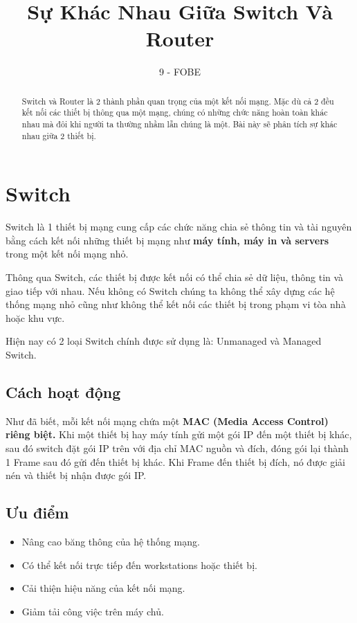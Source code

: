 \documentclass[12pt]{article}
\title{Sự Khác Nhau Giữa Switch Và Router}
\author{\textup{9 - FOBE}}
\begin{document}
    

    \begin{abstract}
    Switch và Router là 2 thành phần quan trọng của một kết nối mạng. Mặc dù cả 2
    đều kết nối các thiết bị thông qua một mạng, chúng có những chức năng hoàn toàn
    khác nhau mà đôi khi người ta thường nhầm lẫn chúng là một. Bài này sẽ phân tích
    sự khác nhau giữa 2 thiết bị. \\
    
    \end{abstract}
    

    \section*{Switch}
    Switch là 1 thiết bị mạng cung cấp các chức năng chia sẻ thông tin và tài nguyên
    bằng cách kết nối những thiết bị mạng như \textbf{máy tính, máy in và servers} trong một
    kết nối mạng nhỏ. \
    
    Thông qua Switch, các thiết bị được kết nối có thể chia sẻ dữ liệu, thông tin và
    giao tiếp với nhau. Nếu không có Switch chúng ta không thể xây dựng các hệ thống
    mạng nhỏ cũng như không thể kết nối các thiết bị trong phạm vi tòa nhà hoặc khu vực. \

    Hiện nay có 2 loại Switch chính được sử dụng là: Unmanaged và Managed Switch.
    
    
    \subsection*{Cách hoạt động}
    Như đã biết, mỗi kết nối mạng chứa một \textbf{MAC (Media Access Control) riêng biệt.}
    Khi một thiết bị hay máy tính gửi một gói IP đến một thiết bị khác, sau đó switch đặt
    gói IP trên với địa chỉ MAC nguồn và đích, đóng gói lại thành 1 Frame sau đó gửi
    đến thiết bị khác. Khi Frame đến thiết bị đích, nó được giải nén và thiết bị nhận được gói IP.

    \subsection*{Ưu điểm}
    \begin{itemize}
        \item Nâng cao băng thông của hệ thống mạng.
        \item Có thể kết nối trực tiếp đến workstations hoặc thiết bị.
        \item Cải thiện hiệu năng của kết nối mạng.
        \item Giảm tải công việc trên máy chủ.
    \end{itemize}
    
\end{document}
